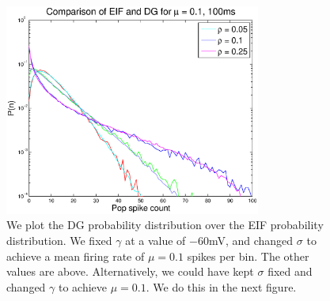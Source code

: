 \documentclass[11pt]{article}
\begin{document}
\begin{figure}[H]
	\centering
	\includegraphics[width=0.75\textwidth]{../Figures/EIF/DG_EIF_Macke_2a_100ms_semilog}
	\caption{\footnotesize We plot the DG probability distribution over the EIF probability distribution. We fixed $\gamma$ at a value of $-60$mV, and changed $\sigma$ to achieve a mean firing rate of $\mu = 0.1$ spikes per bin. The other values are above. Alternatively, we could have kept $\sigma$ fixed and changed $\gamma$ to achieve $\mu = 0.1$. We do this in the next figure.}
	\label{figdgeif}
\end{figure}

\newpage
\end{document}
